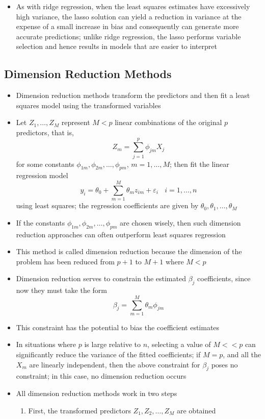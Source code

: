 \documentclass[12pt]{article}
\begin{document}
\begin{itemize}
\item As with ridge regression, when the least squares estimates have excessively high variance, the lasso solution can yield a reduction in variance at the expense of a small increase in bias and consequently can generate more accurate predictions; unlike ridge regression, the lasso performs variable selection and hence results in models that are easier to interpret 
\end{itemize}
\subsection{Dimension Reduction Methods}
\begin{itemize} 
\item Dimension reduction methods transform the predictors and then fit a least squares model using the transformed variables 
\item Let $Z_1,\dots,Z_M$ represent $M < p$ linear combinations of the original $p$ predictors, that is, $$ Z_m = \sum_{j=1}^p \phi_{jm}X_j $$ for some constants $\phi_{1m},\phi_{2m},\dots,\phi_{pm}$, $m=1,\dots,M$; then fit the linear regression model $$ y_i = \theta_0 + \sum_{m=1}^M \theta_mz_{im} + \varepsilon_i ~~~~ i = 1,\dots,n $$ using least squares; the regression coefficients are given by $\theta_0,\theta_1,\dots,\theta_M$
\item If the constants $\phi_{1m},\phi_{2m},\dots,\phi_{pm}$ are chosen wisely, then such dimension reduction approaches can often outperform least squares regression 
\item This method is called dimension reduction because the dimension of the problem has been reduced from $p+1$ to $M+1$ where $M < p$
\item Dimension reduction serves to constrain the estimated $\beta_j$ coefficients, since now they must take the form $$ \beta_j = \sum_{m=1}^M \theta_m\phi_{jm} $$ 
\item This constraint has the potential to bias the coefficient estimates
\item In situations where $p$ is large relative to $n$, selecting a value of $M << p$ can significantly reduce the variance of the fitted coefficients; if $M=p$, and all the $X_m$ are linearly independent, then the above constraint for $\beta_j$ poses no constraint; in this case, no dimension reduction occurs 
\item All dimension reduction methods work in two steps \begin{enumerate} 
\item First, the transformed predictors $Z_1,Z_2,\dots,Z_M$ are obtained

\end{enumerate}
\end{itemize}
\end{document}
